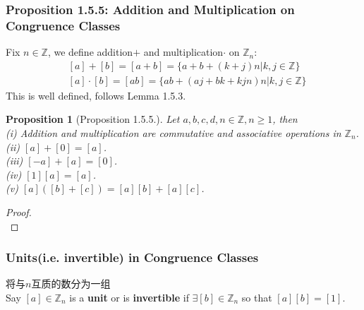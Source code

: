 \documentclass[11pt,a4paper]{article}
\newtheorem{proposition}{Proposition}
\begin{document}
\subsubsection{Proposition 1.5.5: Addition and Multiplication on Congruence Classes}
Fix $n\in\mathbb{Z}$, we define addition$+$ and multiplication$\cdot$ on $\mathbb{Z}_n$:
\begin{equation}
    \begin{aligned}
        &[a]+[b]=[a+b]=\{a+b+(k+j)n|k,j\in\mathbb{Z}\}\\
        &[a]\cdot [b]=[ab]=\{ab+(aj+bk+kjn)n|k,j\in\mathbb{Z} \}
    \end{aligned}
    \nonumber
\end{equation}
This is well defined, follows Lemma 1.5.3.
\begin{proposition}[Proposition 1.5.5.]
    Let $a,b,c,d,n\in\mathbb{Z}, n\geq 1$, then\\
    (i) Addition and multiplication are commutative and associative operations in $\mathbb{Z}_n$.\\
    (ii) $[a] + [0] = [a]$.\\(iii) $[-a] + [a] = [0]$.\\(iv) $[1][a] = [a]$.\\(v) $[a]([b] + [c]) = [a][b] + [a][c]$.
\end{proposition}
\begin{proof}
\quad\\

\end{proof}
\subsubsection{Units(i.e. invertible) in Congruence Classes}
将与$n$互质的数分为一组\\
Say $[a] \in \mathbb{Z}_n$ is a \textbf{unit} or is \textbf{invertible} if $\exists [b] \in \mathbb{Z}_n$ so that $[a][b] = [1]$.
\end{document}
